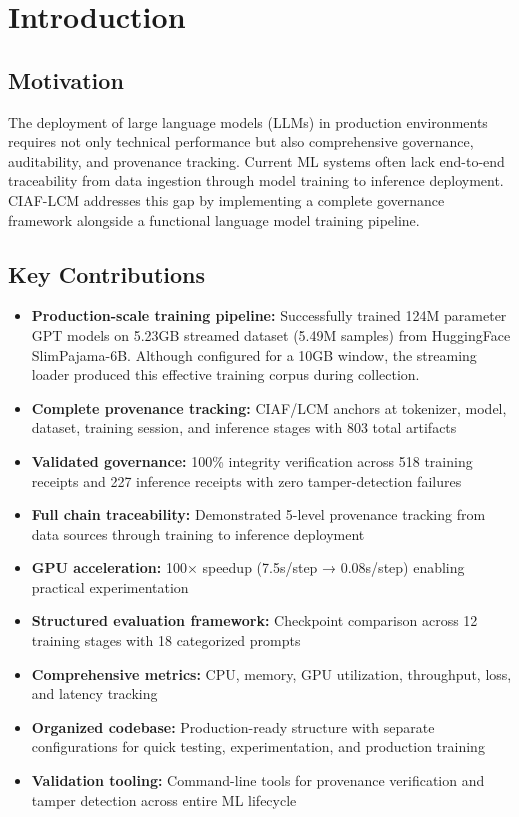 \documentclass[11pt,a4paper]{article}
\begin{document}
\section{Introduction}

\subsection{Motivation}
The deployment of large language models (LLMs) in production environments requires not only technical performance but also comprehensive governance, auditability, and provenance tracking. Current ML systems often lack end-to-end traceability from data ingestion through model training to inference deployment. CIAF-LCM addresses this gap by implementing a complete governance framework alongside a functional language model training pipeline.

\subsection{Key Contributions}
\begin{itemize}
    \item \textbf{Production-scale training pipeline:} Successfully trained 124M parameter GPT models on 5.23GB streamed dataset (5.49M samples) from HuggingFace SlimPajama-6B. Although configured for a 10GB window, the streaming loader produced this effective training corpus during collection.
    \item \textbf{Complete provenance tracking:} CIAF/LCM anchors at tokenizer, model, dataset, training session, and inference stages with 803 total artifacts
    \item \textbf{Validated governance:} 100\% integrity verification across 518 training receipts and 227 inference receipts with zero tamper-detection failures
    \item \textbf{Full chain traceability:} Demonstrated 5-level provenance tracking from data sources through training to inference deployment
    \item \textbf{GPU acceleration:} 100× speedup (7.5s/step → 0.08s/step) enabling practical experimentation
    \item \textbf{Structured evaluation framework:} Checkpoint comparison across 12 training stages with 18 categorized prompts
    \item \textbf{Comprehensive metrics:} CPU, memory, GPU utilization, throughput, loss, and latency tracking
    \item \textbf{Organized codebase:} Production-ready structure with separate configurations for quick testing, experimentation, and production training
    \item \textbf{Validation tooling:} Command-line tools for provenance verification and tamper detection across entire ML lifecycle
\end{itemize}
\end{document}
